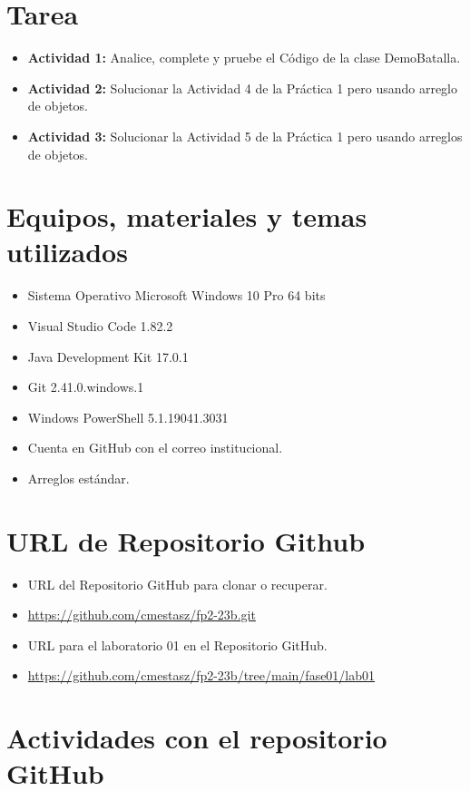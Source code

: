 \documentclass{article}
\begin{document}
\section{Tarea}
\begin{itemize}
	\item \textbf{Actividad 1:} Analice, complete y pruebe el Código de la clase DemoBatalla.
	\item \textbf{Actividad 2:} Solucionar la Actividad 4 de la Práctica 1 pero usando arreglo de objetos.
	\item \textbf{Actividad 3:} Solucionar la Actividad 5 de la Práctica 1 pero usando arreglos de objetos.
\end{itemize}
\pagebreak

\section{Equipos, materiales y temas utilizados}
\begin{itemize}
	\item Sistema Operativo Microsoft Windows 10 Pro 64 bits
	\item Visual Studio Code 1.82.2
	\item Java Development Kit 17.0.1
	\item Git 2.41.0.windows.1
	\item Windows PowerShell 5.1.19041.3031
	\item Cuenta en GitHub con el correo institucional.
	\item Arreglos estándar.
\end{itemize}

\section{URL de Repositorio Github}
\begin{itemize}
	\item URL del Repositorio GitHub para clonar o recuperar.
	\item \url{https://github.com/cmestasz/fp2-23b.git}
	\item URL para el laboratorio 01 en el Repositorio GitHub.
	\item \url{https://github.com/cmestasz/fp2-23b/tree/main/fase01/lab01}
\end{itemize}

\section{Actividades con el repositorio GitHub}
\end{document}
